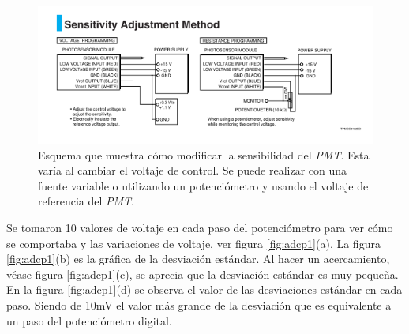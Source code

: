 \begin{figure}[h]
	\centering
	\includegraphics[width=0.9\linewidth]{Imagenes/3/PMTsen}
	\caption[Sensibilidad del \textit{PMT}.]{Esquema que muestra cómo modificar la sensibilidad del \textit{PMT}. Esta varía al cambiar el voltaje de control. Se puede realizar con una fuente variable o utilizando un potenciómetro y usando el voltaje de referencia del \textit{PMT}. \cite{H8249}}
	\label{fig:pmtsen}
\end{figure}
Se tomaron 10 valores de voltaje en cada paso del potenciómetro para ver cómo se comportaba y las variaciones de voltaje, ver figura \ref{fig:adcp1}(a). La figura \ref{fig:adcp1}(b) es la gráfica de la desviación estándar. Al hacer un acercamiento, véase figura \ref{fig:adcp1}(c), se aprecia que la desviación estándar es muy pequeña. En la figura \ref{fig:adcp1}(d) se observa el valor de las desviaciones estándar en cada paso. Siendo de 10mV el valor más grande de la desviación que es equivalente a un paso del potenciómetro digital. 

